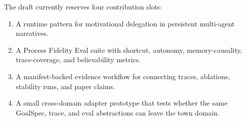 The draft currently reserves four contribution slots:

\begin{enumerate}
  \item A runtime pattern for motivational delegation in persistent multi-agent narratives.
  \item A Process Fidelity Eval suite with shortcut, autonomy, memory-causality, trace-coverage, and believability metrics.
  \item A manifest-backed evidence workflow for connecting traces, ablations, stability runs, and paper claims.
  \item A small cross-domain adapter prototype that tests whether the same GoalSpec, trace, and eval abstractions can leave the town domain.
\end{enumerate}
